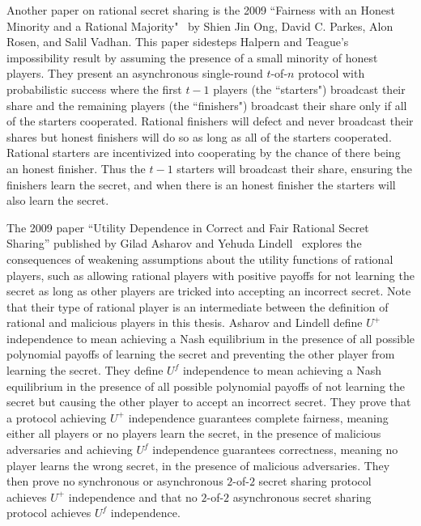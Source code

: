 \documentclass{dalcsthesis}
\begin{document}
Another paper on rational secret sharing is the 2009 ``Fairness with an Honest Minority and a Rational Majority"~\cite{ong09} by Shien Jin Ong, David C. Parkes, Alon Rosen, and Salil Vadhan. This paper sidesteps Halpern and Teague's impossibility result by assuming the presence of a small minority of honest players. They present an asynchronous single-round $t$-of-$n$ protocol with probabilistic success where the first $t-1$ players (the ``starters") broadcast their share and the remaining players (the ``finishers") broadcast their share only if all of the starters cooperated. Rational finishers will defect and never broadcast their shares but honest finishers will do so as long as all of the starters cooperated. Rational starters are incentivized into cooperating by the chance of there being an honest finisher. Thus the $t-1$ starters will broadcast their share, ensuring the finishers learn the secret, and when there is an honest finisher the starters will also learn the secret.

The 2009 paper ``Utility Dependence in Correct and Fair Rational Secret Sharing'' published by Gilad Asharov and Yehuda Lindell~\cite{asharov09} explores the consequences of weakening assumptions about the utility functions of rational players, such as allowing rational players with positive payoffs for not learning the secret as long as other players are tricked into accepting an incorrect secret. Note that their type of rational player is an intermediate between the definition of rational and malicious players in this thesis. Asharov and Lindell define $U^{+}$ independence to mean achieving a Nash equilibrium in the presence of all possible polynomial payoffs of learning the secret and preventing the other player from learning the secret. They define $U^f$ independence to mean achieving a Nash equilibrium in the presence of all possible polynomial payoffs of not learning the secret but causing the other player to accept an incorrect secret. They prove that a protocol achieving $U^{+}$ independence guarantees complete fairness, meaning either all players or no players learn the secret, in the presence of malicious adversaries and achieving $U^f$ independence guarantees correctness, meaning no player learns the wrong secret, in the presence of malicious adversaries. They then prove no synchronous or asynchronous $2$-of-$2$ secret sharing protocol achieves $U^{+}$ independence and that no $2$-of-$2$ asynchronous secret sharing protocol achieves $U^f$ independence.
\end{document}
